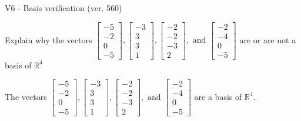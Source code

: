 \begin{exercise}
  \begin{exerciseTitle}V6 - Basis verification (ver. 560)\end{exerciseTitle}
  \begin{exerciseStatement}
    Explain why the vectors \(\left[\begin{array}{r}
-5 \\
-2 \\
0 \\
-5
\end{array}\right] , \left[\begin{array}{r}
-3 \\
3 \\
3 \\
1
\end{array}\right] , \left[\begin{array}{r}
-2 \\
-2 \\
-3 \\
2
\end{array}\right] , \text{ and } \left[\begin{array}{r}
-2 \\
-4 \\
0 \\
-5
\end{array}\right]\) are or are not a basis of \(\mathbb{R}^4\)	


  \end{exerciseStatement}
  \begin{exerciseAnswer}
   The vectors \(\left[\begin{array}{r}
-5 \\
-2 \\
0 \\
-5
\end{array}\right] , \left[\begin{array}{r}
-3 \\
3 \\
3 \\
1
\end{array}\right] , \left[\begin{array}{r}
-2 \\
-2 \\
-3 \\
2
\end{array}\right] , \text{ and } \left[\begin{array}{r}
-2 \\
-4 \\
0 \\
-5
\end{array}\right]\) 
  	 are  a basis of \(\mathbb{R}^4\).
  


  \end{exerciseAnswer}
\end{exercise}